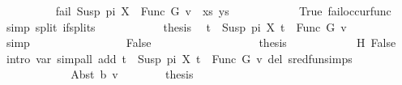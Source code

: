 \begin{isabellebody}
{}\isanewline
\ \ \ \ \ \ \ \ \isamarkupfalse%
\ {\isachardoublequoteopen}fail\ {\isacharparenleft}{\kern0pt}{\isacharparenleft}{\kern0pt}Susp\ pi\ X\ {\isasymapprox}{\isacharquery}{\kern0pt}\ Func\ G\ v{\isacharparenright}{\kern0pt}\ {\isacharhash}{\kern0pt}\ xs{\isacharcomma}{\kern0pt}\ ys{\isacharparenright}{\kern0pt}{\isachardoublequoteclose}\isanewline
\ \ \ \ \ \ \ \ \ \ \isamarkupfalse%
\ True\ fail{\isacharunderscore}{\kern0pt}occur{\isacharunderscore}{\kern0pt}func\ \isamarkupfalse%
\ {\isacharparenleft}{\kern0pt}simp\ split{\isacharcolon}{\kern0pt}\ if{\isacharunderscore}{\kern0pt}splits{\isacharparenright}{\kern0pt}\isanewline
\ \ \ \ \ \ \ \ \isamarkupfalse%
\ \isamarkupfalse%
\ {\isacharquery}{\kern0pt}thesis\ \isamarkupfalse%
\ {\isacartoucheopen}t{}\ {\isacharequal}{\kern0pt}\ Susp\ pi\ X{\isacartoucheclose}\ {\isacartoucheopen}t{}\ {\isacharequal}{\kern0pt}\ Func\ G\ v{\isacartoucheclose}\isanewline
\ \ \ \ \ \ \ \ \ \ \isamarkupfalse%
\ simp\isanewline
\ \ \ \ \ \ \isamarkupfalse%
\isanewline
\ \ \ \ \ \ \ \ \isamarkupfalse%
\ False\isanewline
\ \ \ \ \ \ \ \ %
\isanewline
\ \ \ \ \ \ \ \ \isamarkupfalse%
\ {\isacharquery}{\kern0pt}thesis\isanewline
\ \ \ \ \ \ \ \ \ \ \isamarkupfalse%
\ H\ False\ \isamarkupfalse%
\ {\isacharparenleft}{\kern0pt}intro\ var{\isacharunderscore}{\kern0pt}{}{\isacharparenright}{\kern0pt}\ {\isacharparenleft}{\kern0pt}simp{\isacharunderscore}{\kern0pt}all\ add{\isacharcolon}{\kern0pt}\ {\isacartoucheopen}t{}\ {\isacharequal}{\kern0pt}\ Susp\ pi\ X{\isacartoucheclose}\ {\isacartoucheopen}t{}\ {\isacharequal}{\kern0pt}\ Func\ G\ v{\isacartoucheclose}\ del{\isacharcolon}{\kern0pt}\ sred{\isacharunderscore}{\kern0pt}fun{\isachardot}{\kern0pt}simps{\isacharparenright}{\kern0pt}\isanewline
\ \ \ \ \ \ \isamarkupfalse%
\isanewline
\ \ \ \ \isamarkupfalse%
\isanewline
\ \ \ \ \ \ \isamarkupfalse%
\ {\isacharparenleft}{\kern0pt}Abst\ b\ v{\isacharparenright}{\kern0pt}\isanewline
\ \ \ \ \ \ \isamarkupfalse%
\ {\isacharquery}{\kern0pt}thesis\isanewline
\ \ \ \ \ \ \isamarkupfalse%

\end{isabellebody}
